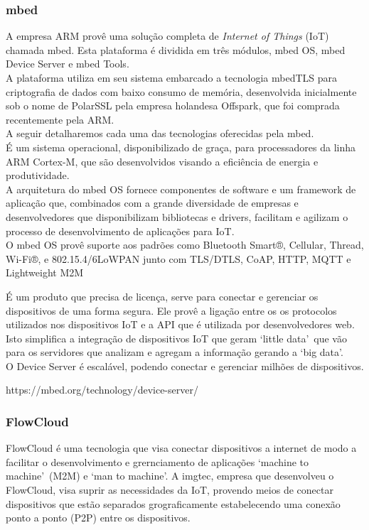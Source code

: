 \subsubsection{mbed}
A empresa ARM provê uma solução completa de \textit{Internet of Things} (IoT) chamada mbed\cite{mbed}. Esta plataforma é dividida em três módulos, mbed OS, mbed Device Server e mbed Tools.\\
A plataforma utiliza em seu sistema embarcado a tecnologia mbedTLS para criptografia de dados com baixo consumo de memória, desenvolvida inicialmente sob o nome de PolarSSL pela empresa holandesa Offspark, que foi comprada recentemente pela ARM.\\
A seguir detalharemos cada uma das tecnologias oferecidas pela mbed.\\

É um sistema operacional, disponibilizado de graça, para processadores da linha ARM Cortex-M, que são desenvolvidos visando a eficiência de energia e produtividade.\\
A arquitetura do mbed OS fornece componentes de software e um framework de aplicação que, combinados com a grande diversidade de empresas e desenvolvedores que disponibilizam bibliotecas e drivers, facilitam e agilizam o processo de desenvolvimento de aplicações para IoT.\\
O mbed OS provê suporte aos padrões como Bluetooth Smart®, Cellular, Thread, Wi-Fi®, e 802.15.4/6LoWPAN junto com TLS/DTLS, CoAP, HTTP, MQTT e Lightweight M2M

É um produto que precisa de licença, serve para conectar e gerenciar os dispositivos de uma forma segura. Ele provê a ligação entre os os protocolos utilizados nos dispositivos IoT e a API que é utilizada por desenvolvedores web. Isto simplifica a integração de dispositivos IoT que geram \lq little data\rq\ que vão para os servidores que analizam e agregam a informação gerando a \lq big data\rq.\\
O Device Server é escalável, podendo conectar e gerenciar milhões de dispositivos.

https://mbed.org/technology/device-server/ \\

\subsubsection{FlowCloud}
FlowCloud \cite{flowcloud} é uma tecnologia que visa conectar dispositivos a internet de modo a facilitar o desenvolvimento e grernciamento de aplicações \lq machine to machine\rq\ (M2M) e \lq man to machine\rq. A imgtec, empresa que desenvolveu o FlowCloud, visa suprir as necessidades da IoT, provendo meios de conectar dispositivos que estão separados grograficamente estabelecendo uma conexão ponto a ponto (P2P) entre os dispositivos.

